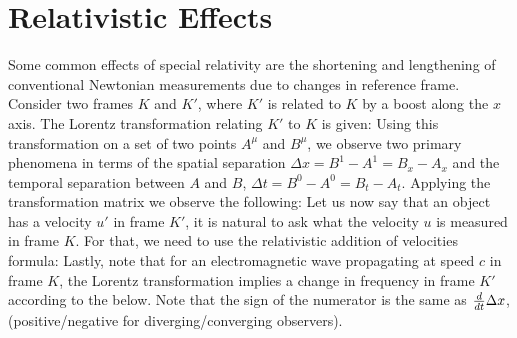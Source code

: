 \section{Relativistic Effects}
Some common effects of special relativity are the shortening and lengthening of conventional Newtonian measurements due to changes in reference frame. Consider two frames $K$ and $K'$, where $K'$ is related to $K$ by a boost along the $x$ axis. The Lorentz transformation relating $K'$ to $K$ is given:
Using this transformation on a set of two points $A^\mu$ and $B^\mu$, we observe two primary phenomena in terms of the spatial separation $\Delta x = B^1 - A^1 = B_x - A_x$ and the temporal separation between $A$ and $B$, $\Delta t = B^0 - A^0 = B_t - A_t$. Applying the transformation matrix we observe the following:
Let us now say that an object has a velocity $u'$ in frame $K'$, it is natural to ask what the velocity $u$ is measured in frame $K$. For that, we need to use the relativistic addition of velocities formula:
Lastly, note that for an electromagnetic wave propagating at speed $c$ in frame $K$, the Lorentz transformation implies a change in frequency in frame $K'$ according to the below. Note that the sign of the numerator is the same as $\frac{d }{dt}\Delta x$, (positive/negative for diverging/converging observers).


